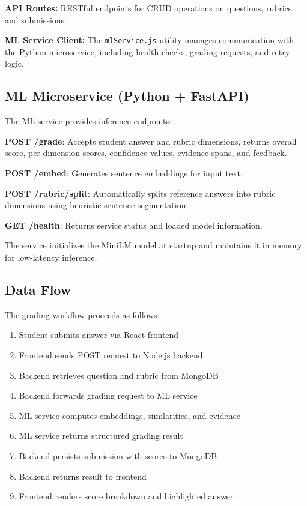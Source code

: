 \documentclass[conference]{IEEEtran}
\begin{document}
\textbf{API Routes:} RESTful endpoints for CRUD operations on questions, rubrics, and submissions.

\textbf{ML Service Client:} The \texttt{mlService.js} utility manages communication with the Python microservice, including health checks, grading requests, and retry logic.

\subsection{ML Microservice (Python + FastAPI)}
The ML service provides inference endpoints:

\textbf{POST /grade}: Accepts student answer and rubric dimensions, returns overall score, per-dimension scores, confidence values, evidence spans, and feedback.

\textbf{POST /embed}: Generates sentence embeddings for input text.

\textbf{POST /rubric/split}: Automatically splits reference answers into rubric dimensions using heuristic sentence segmentation.

\textbf{GET /health}: Returns service status and loaded model information.

The service initializes the MiniLM model at startup and maintains it in memory for low-latency inference.

\subsection{Data Flow}
The grading workflow proceeds as follows:
\begin{enumerate}
    \item Student submits answer via React frontend
    \item Frontend sends POST request to Node.js backend
    \item Backend retrieves question and rubric from MongoDB
    \item Backend forwards grading request to ML service
    \item ML service computes embeddings, similarities, and evidence
    \item ML service returns structured grading result
    \item Backend persists submission with scores to MongoDB
    \item Backend returns result to frontend
    \item Frontend renders score breakdown and highlighted answer
\end{enumerate}
\end{document}
